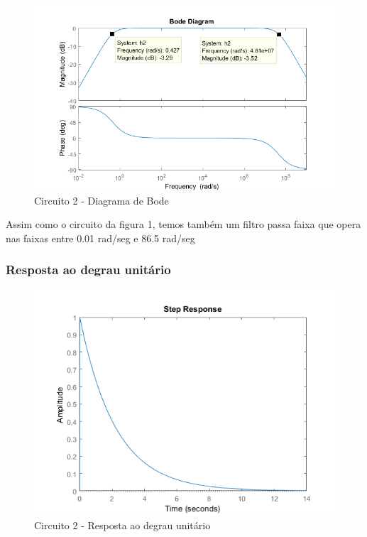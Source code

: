 \documentclass[a4paper, 12pt]{article}
\begin{document}
			\begin{figure}[!ht]
				\centering
				\includegraphics[scale=0.7]{img/1f_circ2.png}
				\caption{Circuito 2 - Diagrama de Bode}	
			\end{figure}			
			\newpage		
			Assim como o circuito da figura 1, temos também um filtro passa faixa que opera nas faixas entre 0.01 rad/seg e 86.5 rad/seg
			
			\subsubsection{Resposta ao degrau unitário}
			\begin{figure}[!ht]
				\centering
				\includegraphics[scale=0.71]{img/1g_circ2.png}
				\caption{Circuito 2 - Resposta ao degrau unitário}	
			\end{figure}					
\end{document}

